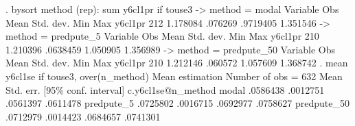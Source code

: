 . bysort method (rep): sum y6cl1pr if touse3
{\smallskip}
-> method = modal
{\smallskip}
    Variable {\VBAR}        Obs        Mean    Std. dev.       Min        Max
     y6cl1pr {\VBAR}        212    1.178084     .076269   .9719405   1.351546
{\smallskip}
-> method = predpute_5
{\smallskip}
    Variable {\VBAR}        Obs        Mean    Std. dev.       Min        Max
     y6cl1pr {\VBAR}        210    1.210396    .0638459   1.050905   1.356989
{\smallskip}
-> method = predpute_50
{\smallskip}
    Variable {\VBAR}        Obs        Mean    Std. dev.       Min        Max
     y6cl1pr {\VBAR}        210    1.212146     .060572   1.057609   1.368742
{\smallskip}
{\smallskip}
. mean y6cl1se if touse3, over(n_method)
{\smallskip}
Mean estimation                                  Number of obs = 632
{\smallskip}
                   {\VBAR}       Mean   Std. err.     [95\% conf. interval]
c.y6cl1se@n_method {\VBAR}
            modal  {\VBAR}   .0586438   .0012751      .0561397    .0611478
       predpute_5  {\VBAR}   .0725802   .0016715      .0692977    .0758627
      predpute_50  {\VBAR}   .0712979   .0014423      .0684657    .0741301
